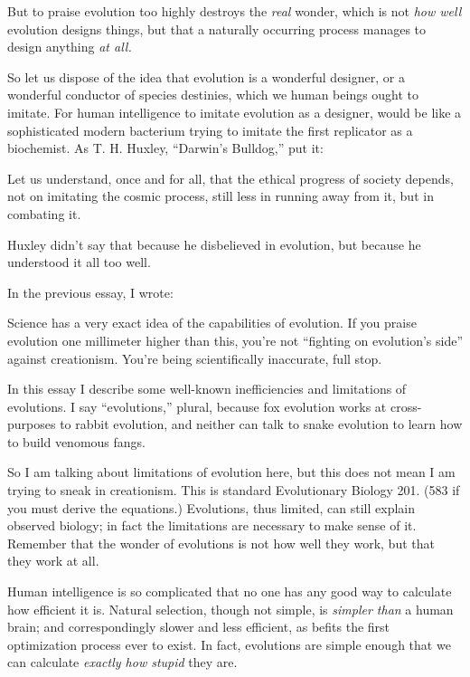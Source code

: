 {
 But to praise evolution too highly destroys the \textit{real}
wonder, which is not \textit{how well} evolution designs things, but
that a naturally occurring process manages to design anything
\textit{at all.}}

{
 So let us dispose of the idea that evolution is a wonderful
designer, or a wonderful conductor of species destinies, which we human
beings ought to imitate. For human intelligence to imitate evolution as
a designer, would be like a sophisticated modern bacterium trying to
imitate the first replicator as a biochemist. As T. H. Huxley,
``Darwin's
Bulldog,'' put it:}

{
 Let us understand, once and for all, that the ethical progress of
society depends, not on imitating the cosmic process, still less in
running away from it, but in combating it.}

{
 Huxley didn't say that because he disbelieved in
evolution, but because he understood it all too well.}

\myendsectiontext


\bigskip


{
 In the previous essay, I wrote:}

{
 Science has a very exact idea of the capabilities of evolution. If
you praise evolution one millimeter higher than this,
you're not ``fighting on
evolution's side'' against
creationism. You're being scientifically inaccurate,
full stop.}

{
 In this essay I describe some well-known inefficiencies and
limitations of evolutions. I say
``evolutions,'' plural, because fox
evolution works at cross-purposes to rabbit evolution, and neither can
talk to snake evolution to learn how to build venomous fangs.}

{
 So I am talking about limitations of evolution here, but this does
not mean I am trying to sneak in creationism. This is standard
Evolutionary Biology 201. (583 if you must derive the equations.)
Evolutions, thus limited, can still explain observed biology; in fact
the limitations are necessary to make sense of it. Remember that the
wonder of evolutions is not how well they work, but that they work at
all.}

{
 Human intelligence is so complicated that no one has any good way
to calculate how efficient it is. Natural selection, though not simple,
is \textit{simpler than} a human brain; and correspondingly slower and
less efficient, as befits the first optimization process ever to exist.
In fact, evolutions are simple enough that we can calculate
\textit{exactly how stupid} they are.}

